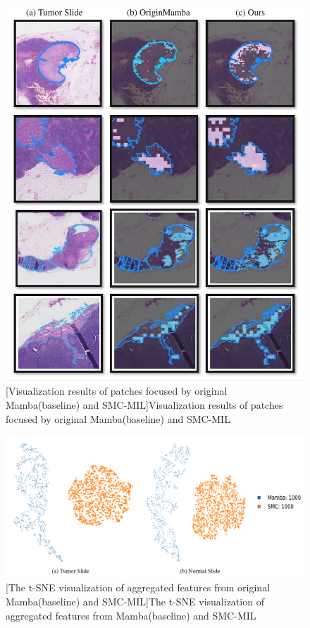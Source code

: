 \begin{figure}[h!]
  \centering
  \includegraphics[width=0.8\columnwidth]{figures/Visualize_cropped.pdf}
  [Visualization results of patches focused by original Mamba(baseline) and SMC-MIL]{Visualization results of patches focused by original Mamba(baseline) and SMC-MIL}
  \label{figure4: visualize}
\end{figure}

\begin{figure}[h!]
  \centering
  \includegraphics[width=0.8\columnwidth]{figures/t-SNE.png}
  [The t-SNE visualization of aggregated features from original Mamba(baseline) and SMC-MIL]{The t-SNE visualization of aggregated features from Mamba(baseline) and SMC-MIL}
  \label{figure4: tSNE}
\end{figure}


